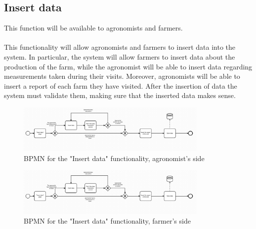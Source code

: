 \documentclass[10pt]{report}
\begin{document}
\subsection{Insert data}
This function will be available to agronomists and farmers.\\ \\
This functionality will allow agronomists and farmers to insert data into the system. In particular, the system will allow farmers to insert data about the production of the farm, while the agronomist will be able to insert data regarding measurements taken during their visits. Moreover, agronomists will be able to insert a report of each farm they have visited.
After the insertion of data the system must validate them, making sure that the inserted data makes sense.
\begin{figure}[H]
    \centering
    \includegraphics[width=350px]{BPMN/BPMN 223a.jpg}
    \caption{BPMN for the "Insert data" functionality, agronomist's side}
\end{figure}
\begin{figure}[H]
    \centering
    \includegraphics[width=350px]{BPMN/BPMN 223a.jpg}
    \caption{BPMN for the "Insert data" functionality, farmer's side}
\end{figure}
\end{document}
